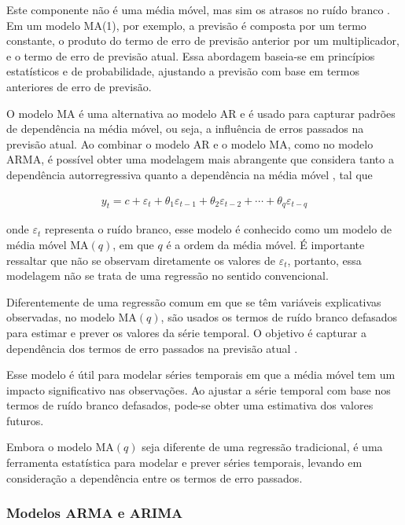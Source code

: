 Este componente não é uma média móvel, mas sim os atrasos no ruído branco \cite{signal}.
Em um modelo MA(1), por exemplo, a previsão é composta por um termo constante, o produto do termo de erro de previsão anterior por um multiplicador, e o termo de erro de previsão atual. Essa abordagem baseia-se em princípios estatísticos e de probabilidade, ajustando a previsão com base em termos anteriores de erro de previsão.

O modelo MA é uma alternativa ao modelo AR e é usado para capturar padrões de dependência na média móvel, ou seja, a influência de erros passados na previsão atual. Ao combinar o modelo AR e o modelo MA, como no modelo ARMA, é possível obter uma modelagem mais abrangente que considera tanto a dependência autorregressiva quanto a dependência na média móvel \cite{arima}, tal que



\begin{eqnarray}
	y_t=c+\varepsilon_t+\theta_1 \varepsilon_{t-1}+\theta_2 \varepsilon_{t-2}+\cdots+\theta_q \varepsilon_{t-q}\label{eq:ma}
\end{eqnarray}

\noindent onde $\varepsilon_t$ representa o ruído branco, esse modelo é conhecido como um modelo de média móvel MA$(q)$, em que $q$ é a ordem da média móvel. É importante ressaltar que não se observam diretamente os valores de $\varepsilon_t$, portanto, essa modelagem não se trata de uma regressão no sentido convencional.

Diferentemente de uma regressão comum em que se têm variáveis explicativas observadas, no modelo MA$(q)$, são usados os termos de ruído branco defasados para estimar e prever os valores da série temporal. O objetivo é capturar a dependência dos termos de erro passados na previsão atual \cite{arima}.

Esse modelo é útil para modelar séries temporais em que a média móvel tem um impacto significativo nas observações. Ao ajustar a série temporal com base nos termos de ruído branco defasados, pode-se obter uma estimativa dos valores futuros.

Embora o modelo MA$(q)$ seja diferente de uma regressão tradicional, é uma ferramenta estatística para modelar e prever séries temporais, levando em consideração a dependência entre os termos de erro passados.


\subsubsection{Modelos ARMA e ARIMA}\label{subsubsec:arma}

